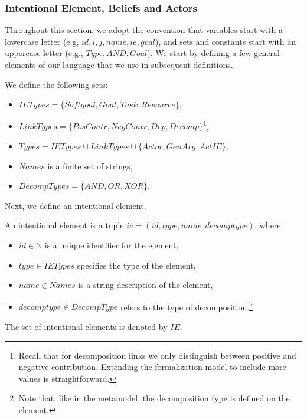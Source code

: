 \subsubsection{Intentional Element, Beliefs and Actors}

Throughout this section, we adopt the convention that variables start with a lowercase letter (e.g, $id, i, j, name, ie, goal$), and sets and constants start with an uppercase letter (e.g., $Type, AND, Goal$). We start by defining a few general elements of our language that we use in subsequent definitions.

\begin{definition}
\label{def:set-definitions}
We define the following sets:
\begin{itemize}
\item $IETypes = \{Softgoal, Goal, Task, Resource\}$,
\item $LinkTypes = \{PosContr, NegContr, Dep, Decomp\}$\footnote{Recall that for decomposition links we only distinguish between positive and negative contribution. Extending the formalization model to include more values is straightforward.},
\item $Types = IETypes \cup LinkTypes\cup\{Actor, GenArg, ActIE\}$,
\item $Names$ is a finite set of strings,
\item $DecompTypes = \{AND,OR,XOR\}$.
\end{itemize}
\end{definition}
Next, we define an intentional element.

\begin{definition}
\label{def:ie}
An intentional element is a tuple $ie = (id, type, name, decomptype)$, where:
\begin{itemize}
\item $id\in \mathbb{N}$ is a unique identifier for the element,
\item $type\in IETypes$ specifies the type of the element,
\item $name \in Names$ is a string description of the element,
\item $decomptype\in DecompType$ refers to the type of decomposition.\footnote{Note that, like in the metamodel, the decomposition type is defined on the element.}
\end{itemize}
The set of intentional elements is denoted by $IE$.
\end{definition}


